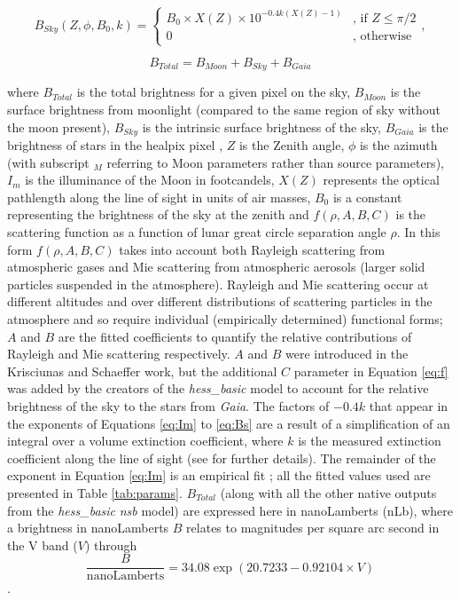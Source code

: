 \begin{equation}
    B_{Sky}(Z,\phi,B_0,k)=\begin{cases} B_0\times X(Z) \times 10^{-0.4k(X(Z)-1)} & \mbox{, if }  Z\leq\pi/2 \\ 0 & \mbox{, otherwise } \end{cases},
    \label{eq:Bs}
\end{equation}

\begin{equation}
    B_{Total}=B_{Moon}+B_{Sky}+B_{Gaia}
    \label{eq:Bt}
\end{equation}

where $B_{Total}$ is the total brightness for a given pixel on the sky, $B_{Moon}$ is the surface brightness from moonlight (compared to the same region of sky without the moon present), $B_{Sky}$ is the intrinsic surface brightness of the sky, $B_{Gaia}$ is the brightness of stars in the healpix pixel \cite{healpix}, $Z$ is the Zenith angle, $\phi$ is the azimuth (with subscript $_M$ referring to Moon parameters rather than source parameters), $I_m$ is the illuminance of the Moon in footcandels, $X(Z)$ represents the optical pathlength along the line of sight in units of air masses, $B_0$ is a constant representing the brightness of the sky at the zenith and $f(\rho,A,B,C)$ is the scattering function as a function of lunar great circle separation angle $\rho$. In this form $f(\rho,A,B,C)$ takes into account both Rayleigh scattering from atmospheric gases and Mie scattering from atmospheric aerosols (larger solid particles suspended in the atmosphere). Rayleigh and Mie scattering occur at different altitudes and over different distributions of scattering particles in the atmosphere and so require individual (empirically determined) functional forms; $A$ and $B$ are the fitted coefficients to quantify the relative contributions of Rayleigh and Mie scattering respectively. $A$ and $B$ were introduced in the Krisciunas and Schaeffer \cite{Krisciunas} work, but the additional $C$ parameter in Equation \ref{eq:f} was added by the creators of the \textit{hess\_basic} model to account for the relative brightness of the sky to the stars from \textit{Gaia}. The factors of $-0.4k$ that appear in the exponents of Equations \ref{eq:Im} to \ref{eq:Bs} are a result of a simplification of an integral over a volume extinction coefficient, where $k$ is the measured extinction coefficient along the line of sight (see \cite{Krisciunas} for further details). The remainder of the exponent in Equation \ref{eq:Im} is an empirical fit \cite{Krisciunas}; all the fitted values used are presented in Table \ref{tab:params}. $B_{Total}$ (along with all the other native outputs from the \textit{hess\_basic} \textit{nsb} model) are expressed here in nanoLamberts (nLb), where a brightness in nanoLamberts $B$ relates to magnitudes per square arc second in the V band ($V$) through
\begin{equation}
    \frac{B}{\textrm{nanoLamberts}}=34.08\exp(20.7233-0.92104\times V)
\end{equation}
\cite{Krisciunas}.

